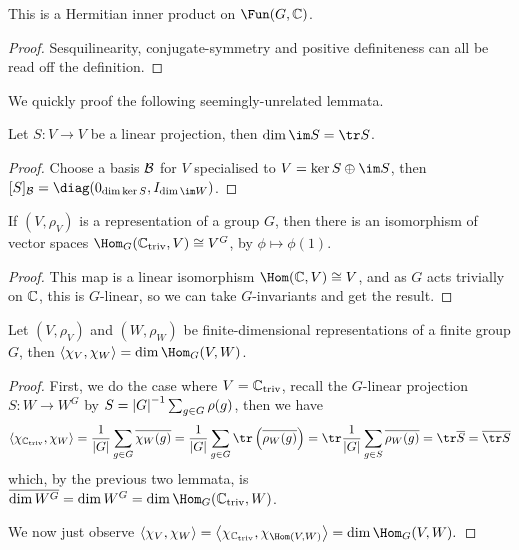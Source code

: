 \documentclass{article}
\begin{document}
\begin{proposition}
    This is a Hermitian inner product on $\Fun(G,\bC)$.\begin{proof}
        Sesquilinearity, conjugate-symmetry and positive definiteness can all be read off the definition.
    \end{proof}
\end{proposition}

We quickly proof the following seemingly-unrelated lemmata.

\begin{lemma}
    Let $S:V\rightarrow V$ be a linear projection, then $\dim \im S = \tr S$.\begin{proof}
        Choose a basis $\mathcal{B}$ for $V$ specialised to $V = \ker S \oplus \im S$, then $[S]_\cB = \diag(0_{\dim\ker S},I_{\dim\im W})$.
    \end{proof}
\end{lemma}

\begin{lemma}
    If $(V,\rho_V)$ is a representation of a group $G$, then there is an isomorphism of vector spaces $\Hom_G(\bC_\text{triv},V)\cong V^G$, by $\phi\mapsto \phi(1)$.
    \begin{proof}
        This map is a linear isomorphism $\Hom(\bC,V)\cong V$, and as $G$ acts trivially on $\mathbb{C}$, this is $G$-linear, so we can take $G$-invariants and get the result.
    \end{proof}
\end{lemma}

\begin{theorem}
    Let $(V,\rho_V)$ and $(W,\rho_W)$ be finite-dimensional representations of a finite group $G$, then $\abr{\chi_V,\chi_W} = \dim\Hom_G(V,W)$.
    \begin{proof}
        First, we do the case where $V = \mathbb{C}_\text{triv}$, recall the $G$-linear projection $S:W\rightarrow W^G$ by $S = \left| G \right|^{-1}\sum_{g\in G}\rho(g)$, then we have\[
        \abr{\chi_{\bC_\text{triv}},\chi_W} = \frac{1}{\abs{G}}\sum_{g\in G}\overline{\chi_W(g)} = \frac{1}{\abs{G}}\sum_{g\in G}\tr\pr{\overline{\rho_W(g)}} = \tr\frac{1}{\abs{G}}\sum_{g\in S}\overline{\rho_W(g)} = \tr\overline{S} = \overline{\tr S}
        \] which, by the previous two lemmata, is $\overline{\dim W^G} = \dim W^G = \dim\Hom_G(\bC_\text{triv},W)$.

        We now just observe $\abr{\chi_V,\chi_W} = \abr{\chi_{\bC_\text{triv}},\chi_{\Hom(V,W)}} = \dim\Hom_G(V,W).$
    \end{proof}
\end{theorem}
\end{document}

